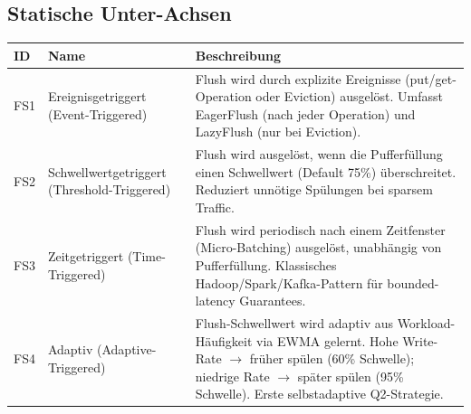 \subsection*{Statische Unter-Achsen}
\begin{scriptsize}
\begin{longtable}{@{}>{\raggedright\arraybackslash}p{1.8cm} >{\raggedright\arraybackslash}p{3.2cm} >{\raggedright\arraybackslash}p{8.5cm}@{}}
\toprule
ID & Name & Beschreibung \\
\midrule
\endhead%
FS1 & Ereignisgetriggert (Event-Triggered) & Flush wird durch explizite Ereignisse (put/\allowbreak{}get-Operation oder Eviction) ausgelöst. Umfasst Eager\allowbreak{}Flush (nach jeder Operation) und Lazy\allowbreak{}Flush (nur bei Eviction). \\
FS2 & Schwellwertgetriggert (Threshold-Triggered) & Flush wird ausgelöst, wenn die Pufferfüllung einen Schwellwert (Default 75\%) überschreitet. Reduziert unnötige Spülungen bei sparsem Traffic. \\
FS3 & Zeitgetriggert (Time-Triggered) & Flush wird periodisch nach einem Zeitfenster (Micro-Batching) ausgelöst, unabhängig von Pufferfüllung. Klassisches Hadoop/\allowbreak{}Spark/\allowbreak{}Kafka-Pattern für bounded-latency Guarantees. \\
FS4 & Adaptiv (Adaptive-Triggered) & Flush-Schwellwert wird adaptiv aus Workload-Häufigkeit via EWMA gelernt. Hohe Write-Rate $\rightarrow$ früher spülen (60\% Schwelle); niedrige Rate $\rightarrow$ später spülen (95\% Schwelle). Erste selbstadaptive Q2-Strategie. \\
\bottomrule
\end{longtable}
\end{scriptsize}

